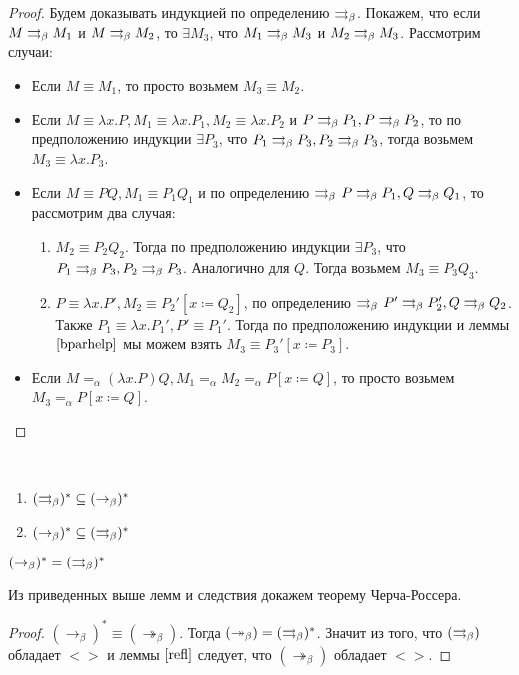 \begin{proof}
	Будем доказывать индукцией по определению $\rightrightarrows_{\beta}$. Покажем, что если $M \rightrightarrows_{\beta} M_1$ и $M \rightrightarrows_{\beta} M_2$, то $\exists{}M_3$, что $M_1 \rightrightarrows_{\beta} M_3$ и $M_2 \rightrightarrows_{\beta} M_3$. Рассмотрим случаи:
	\begin{itemize}
		\item Если $M\equiv M_1$, то просто возьмем $M_3\equiv M_2$.
		\item Если $M\equiv \lambda{}x.P, M_1 \equiv \lambda{}x.P_1, M_2 \equiv \lambda{}x.P_2$ и $P \rightrightarrows_{\beta} P_1, P \rightrightarrows_{\beta} P_2$, то по предположению индукции 
		$\exists P_3$, что $P_1 \rightrightarrows_{\beta} P_3, P_2 \rightrightarrows_{\beta} P_3$, тогда возьмем $M_3\equiv \lambda{}x.P_3$.
		\item Если $M \equiv P Q, M_1 \equiv P_1 Q_1$ и по определению $\rightrightarrows_{\beta}$ $P \rightrightarrows_{\beta} P_1, Q \rightrightarrows_{\beta} Q_1$, то рассмотрим два случая:
		\begin{enumerate}
			\item $M_2 \equiv P_2 Q_2$. Тогда по предположению индукции $\exists P_3$, что $P_1 \rightrightarrows_{\beta} P_3, P_2 \rightrightarrows_{\beta} P_3$. Аналогично для $Q$. Тогда возьмем $M_3 \equiv P_3 Q_3$.
			\item $P\equiv \lambda {}x.P', M_2 \equiv P_2'[x\coloneqq{} Q_2]$, по определению $\rightrightarrows_{\beta}$ $P' \rightrightarrows_{\beta} P_2', Q \rightrightarrows_{\beta} Q_2$. Также $P_1 \equiv \lambda{}x.P_1', P' \equiv P_1'$. Тогда по предположению индукции и леммы $\ref{bparhelp}$ мы можем взять $M_3 \equiv P_3'[x \coloneqq P_3]$.
		\end{enumerate}
	\item Если $M =_\alpha (\lambda{}x.P)Q, M_1 =_\alpha M_2 =_\alpha P[x \coloneqq Q]$, то просто возьмем $M_3 =_\alpha P[x \coloneq Q]$.
	\end{itemize}
\end{proof}

\begin{lemma}
	\
	\begin{enumerate}
		\item $(\rightrightarrows_{\beta} )^{*} \subseteq (\to_{\beta})^{*}$
		\item $(\to_{\beta})^{*} \subseteq (\rightrightarrows_{\beta} )^{*}$
	\end{enumerate}
\end{lemma}

\begin{cons}
	$(\to_{\beta})^{*}=(\rightrightarrows_{\beta} )^{*}$
\end{cons}

Из приведенных выше лемм и следствия докажем теорему Черча-Россера.

\begin{proof}
	$(\to_{\beta})^{*}\equiv(\twoheadrightarrow_{\beta})$. Тогда $(\twoheadrightarrow_{\beta})=(\rightrightarrows_{\beta} )^{*}$. Значит из того, что $(\rightrightarrows_{\beta} )$ обладает $<>$ и леммы $\ref{refl}$ следует, что $(\twoheadrightarrow_{\beta})$ обладает $<>$.
\end{proof}

